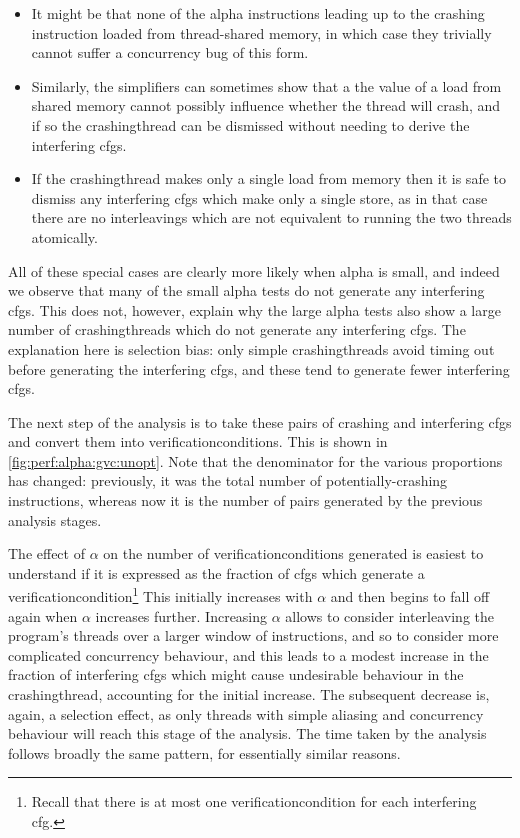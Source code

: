 \begin{itemize}
\item It might be that none of the \gls{alpha} instructions leading up
  to the crashing instruction loaded from thread-shared memory, in
  which case they trivially cannot suffer a concurrency bug of this
  form.
\item Similarly, the simplifiers can sometimes show that a the value
  of a load from shared memory cannot possibly influence whether the
  thread will crash, and if so the \gls{crashingthread} can be
  dismissed without needing to derive the interfering \glspl{cfg}.
\item If the \gls{crashingthread} makes only a single load from memory
  then it is safe to dismiss any interfering \glspl{cfg} which make
  only a single store, as in that case there are no interleavings
  which are not equivalent to running the two threads atomically.
\end{itemize}

All of these special cases are clearly more likely when \gls{alpha} is
small, and indeed we observe that many of the small \gls{alpha} tests
do not generate any interfering \glspl{cfg}.  This does not, however,
explain why the large \gls{alpha} tests also show a large number of
\glspl{crashingthread} which do not generate any interfering
\glspl{cfg}.  The explanation here is selection bias: only simple
\glspl{crashingthread} avoid timing out before generating the
interfering \glspl{cfg}, and these tend to generate fewer interfering
\glspl{cfg}.

The next step of the analysis is to take these pairs of crashing
{\StateMachines} and interfering \glspl{cfg} and convert them into
\glspl{verificationcondition}.  This is shown in
\autoref{fig:perf:alpha:gvc:unopt}.  Note that the denominator for
the various proportions has changed: previously, it was the total
number of potentially-crashing instructions, whereas now it is the
number of pairs generated by the previous analysis stages.

The effect of $\alpha$ on the number of \glspl{verificationcondition}
generated is easiest to understand if it is expressed as the fraction
of \glspl{cfg} which generate a
\gls{verificationcondition}\footnote{Recall that there is at most one
  \gls{verificationcondition} for each interfering \gls{cfg}.}  This
initially increases with $\alpha$ and then begins to fall off again
when $\alpha$ increases further.  Increasing $\alpha$ allows
{\technique} to consider interleaving the program's threads over a
larger window of instructions, and so to consider more complicated
concurrency behaviour, and this leads to a modest increase in the
fraction of interfering \glspl{cfg} which might cause undesirable
behaviour in the \gls{crashingthread}, accounting for the initial
increase.  The subsequent decrease is, again, a selection effect, as
only threads with simple aliasing and concurrency behaviour will reach
this stage of the analysis.  The time taken by the analysis follows
broadly the same pattern, for essentially similar reasons.

